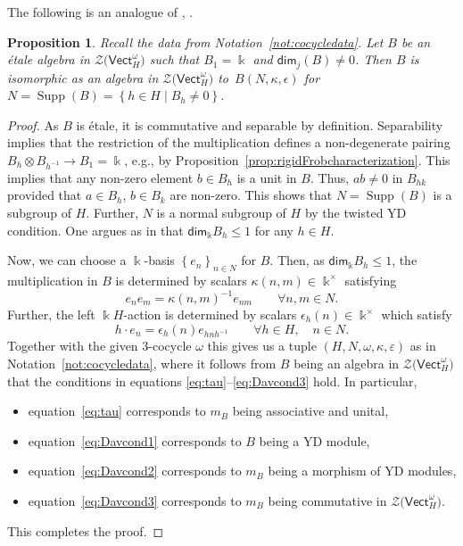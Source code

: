 \documentclass[10pt,a4paper]{amsart}
\numberwithin{equation}{section}
\newtheorem{Proposition}[Theorem]{Proposition}
 { \theoremstyle{definition}
\newtheorem{Definition}[Theorem]{Definition}
\newtheorem{Note}[Theorem]{Note}
\newtheorem{Notation}[Theorem]{Notation}
\newtheorem{Example}[Theorem]{Example}
\newtheorem{Remark}[Theorem]{Remark} }
\newcommand{\Set}[1]{\left\lbrace #1\right\rbrace}
\renewcommand{\dim}{\mathsf{dim}}
\newcommand{\Vect}{\mathsf{Vect}}
\newcommand{\cZ}{\mathcal{Z}}
\begin{document}
The following is an analogue of \cite[Proposition~3.11]{DS}, \cite[Proposition~3.4.2]{Dav3}.
\begin{Proposition}\label{prop:B-classification}
Recall the data from Notation~{\rm \ref{not:cocycledata}}.
 Let $B$ be an \'etale algebra in $\cZ\big(\Vect_H^\omega\big)$ such that $B_1=\Bbbk$ and $\dim_j(B)\neq 0$.
 Then $B$ is isomorphic as an algebra in $\cZ\big(\Vect_H^\omega\big)$ to~$B(N,\kappa,\epsilon)$ for $N=\operatorname{Supp}(B)=\Set{h\in H \mid B_h\neq 0 }$.
\end{Proposition}

\begin{proof}
As $B$ is \'etale, it is commutative and separable by definition. Separability implies that the restriction of the multiplication defines a non-degenerate pairing $B_h\otimes B_{h^{-1}}\to B_1=\Bbbk$, e.g., by Proposition~\ref{prop:rigidFrobcharacterization}.
This implies that any non-zero element $b\in B_h$ is a unit in $B$. Thus, $ab\neq 0$ in $B_{hk}$ provided that $a\in B_h$, $b\in B_k$ are non-zero. This shows that $N=\operatorname{Supp}(B)$ is a subgroup of $H$.
Further, $N$ is a normal subgroup of $H$ by the twisted YD condition.
One argues as in \cite[Lemma~3.4.1]{Dav3} that $\dim_\Bbbk B_h\leq 1$ for any $h\in H$.

Now, we can choose a $\Bbbk$-basis $\Set{e_n}_{n\in N}$ for $B$. Then, as $\dim_\Bbbk B_h\leq 1$, the multiplication in $B$ is determined by scalars $\kappa(n,m)\in \Bbbk^\times$ satisfying
\begin{equation*}e_n e_m = \kappa(n,m)^{-1}e_{nm} \qquad \forall n,m\in N.
\end{equation*}
Further, the left $\Bbbk H$-action is determined by scalars $\epsilon_h(n)\in \Bbbk^\times$ which satisfy
\begin{equation*}
 h\cdot e_n = \epsilon_h(n)e_{hnh^{-1}} \qquad \forall h\in H, \quad n\in N.
\end{equation*}
Together with the given $3$-cocycle $\omega$ this gives us a tuple $(H,N,\omega,\kappa,\varepsilon)$ as in Notation~\ref{not:cocycledata}, where it follows from $B$ being an algebra in $\cZ\big(\Vect_H^\omega\big)$ that the conditions in equations \eqref{eq:tau}--\eqref{eq:Davcond3} hold. In particular,
\begin{itemize}\itemsep=0pt
 \item equation~\eqref{eq:tau} corresponds to $m_B$ being associative and unital,
 \item equation~\eqref{eq:Davcond1} corresponds to $B$ being a YD module,
 \item equation~\eqref{eq:Davcond2} corresponds to $m_B$ being a morphism of YD modules,
 \item equation~\eqref{eq:Davcond3} corresponds to $m_B$ being commutative in $\cZ\big(\Vect_H^\omega\big)$.
\end{itemize}
This completes the proof.
\end{proof}
\end{document}

